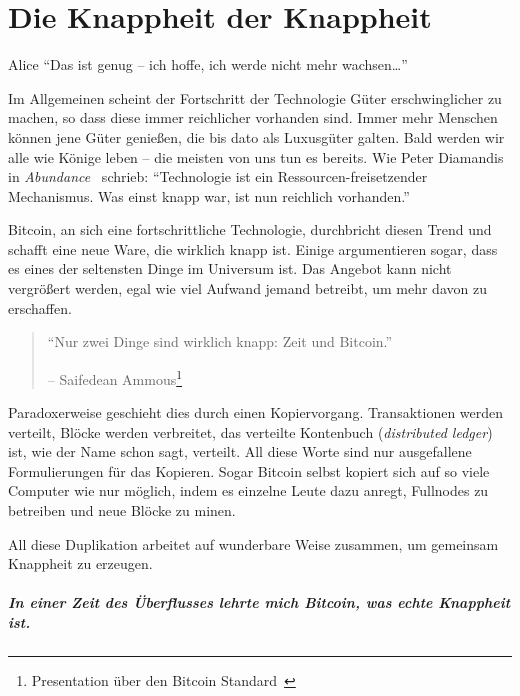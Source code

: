 \chapter{Die Knappheit der Knappheit}
\label{les:2}

\begin{chapquote}{Alice}
\enquote{Das ist genug – ich hoffe, ich werde nicht mehr wachsen\ldots}
\end{chapquote}

Im Allgemeinen scheint der Fortschritt der Technologie Güter erschwinglicher zu
machen, so dass diese immer reichlicher vorhanden sind. Immer mehr Menschen
können jene Güter genießen, die bis dato als Luxusgüter galten. Bald werden wir
alle wie Könige leben -- die meisten von uns tun es bereits. Wie Peter Diamandis
in \textit{Abundance}~\cite{abundance} schrieb: \enquote{Technologie ist ein
Ressourcen-freisetzender Mechanismus. Was einst knapp war, ist nun reichlich
vorhanden.}

Bitcoin, an sich eine fortschrittliche Technologie, durchbricht diesen Trend und
schafft eine neue Ware, die wirklich knapp ist. Einige argumentieren sogar, dass
es eines der seltensten Dinge im Universum ist. Das Angebot kann nicht
vergrößert werden, egal wie viel Aufwand jemand betreibt, um mehr davon zu
erschaffen.

\begin{quotation}\begin{samepage}
\enquote{Nur zwei Dinge sind wirklich knapp: Zeit und Bitcoin.}
\begin{flushright} -- Saifedean Ammous\footnote{Presentation über den Bitcoin
Standard~\cite{bitcoinstandard-pres}}
\end{flushright}\end{samepage}\end{quotation}

Paradoxerweise geschieht dies durch einen Kopiervorgang. Transaktionen werden
verteilt, Blöcke werden verbreitet, das verteilte Kontenbuch
(\textit{distributed ledger}) ist, wie der Name schon sagt, verteilt. All diese
Worte sind nur ausgefallene Formulierungen für das Kopieren. Sogar Bitcoin
selbst kopiert sich auf so viele Computer wie nur möglich, indem es einzelne
Leute dazu anregt, Fullnodes zu betreiben und neue Blöcke zu minen.

All diese Duplikation arbeitet auf wunderbare Weise zusammen, um gemeinsam
Knappheit zu erzeugen.

\paragraph{In einer Zeit des Überflusses lehrte mich Bitcoin, was echte
Knappheit ist.}

